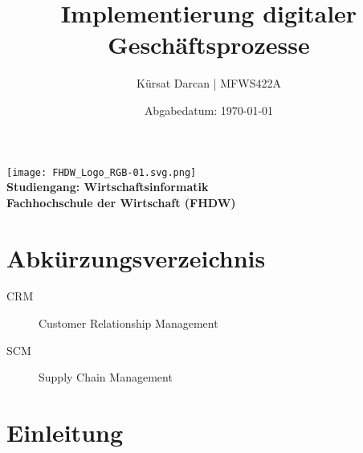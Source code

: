 \documentclass[a4paper,12pt]{article}
\title{\textbf{Implementierung digitaler Geschäftsprozesse}}
\author{Kürsat Darcan | MFWS422A}
\date{Abgabedatum: \today}
\begin{document}
\maketitle
\thispagestyle{empty}
\vspace{2cm}
\begin{center}
    \texttt{[image: FHDW\_Logo\_RGB-01.svg.png]} %
    \\
    \vspace{1cm}
    \textbf{Studiengang: Wirtschaftsinformatik}\\
    \textbf{Fachhochschule der Wirtschaft (FHDW)}
\end{center}
\newpage

\renewcommand{\thepage}{\roman{page}} %
\tableofcontents
\newpage

\listoffigures
{}
\newpage

\listoftables
{}
\newpage

\section*{Abkürzungsverzeichnis}
\begin{description}
    \item[CRM] Customer Relationship Management
    \item[SCM] Supply Chain Management
\end{description}
\newpage

\renewcommand{\thepage}{\arabic{page}} %
\setcounter{page}{1}


\section{Einleitung}
\end{document}
